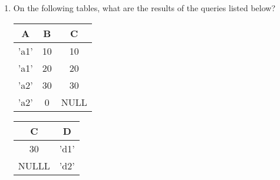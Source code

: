 \documentclass[11pt]{article}
\newcommand{\answer}[2]{\noindent {\bf Answer:} #2}
\renewcommand{\answer}[2]{\vspace{#1}}
\begin{document}
\begin{enumerate}
%
%
%
%
\item On the following tables, what are the results of the queries listed below?

\begin{table}[h]
\hspace{1in}{\bf R}\hspace{.2in}
    \begin{tabular}{|c|c|c|}
        \hline 
        {\bf A} & {\bf B} & {\bf C} \\
        \hline 
            'a1' & 10 & 10 \\
        \hline 
            'a1' & 20 & 20 \\
        \hline 
            'a2' & 30 & 30 \\
        \hline 
            'a2' & 0  & NULL \\
        \hline 
    \end{tabular}
\hspace{1in}{\bf S}\hspace{.2in}
    \begin{tabular}{|c|c|}
        \hline 
        {\bf C} & {\bf D} \\
        \hline 
        30 & 'd1' \\
        \hline 
        NULLL & 'd2' \\
        \hline 
    \end{tabular}
\end{table}


\end{enumerate}
\end{document}
